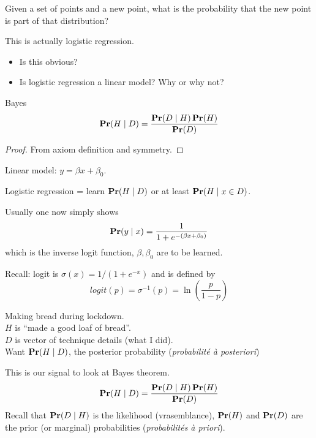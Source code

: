 \begin{example}
  Given a set of points and a new point, what is the probability that
  the new point is part of that distribution?
\end{example}

\begin{soln}
  This is actually logistic regression.

  \begin{itemize}
  \item Is this obvious?
  \item Is logistic regression a linear model?  Why or why not?
  \end{itemize}

  \begin{theorem}{Bayes}
    \begin{displaymath}
      \mathbf{Pr}(H\mid D) = \frac{\mathbf{Pr}(D\mid H)\, \mathbf{Pr}(H)}{\mathbf{Pr}(D)}
    \end{displaymath}
  \end{theorem}
  \begin{proof}
    From axiom definition and symmetry.
  \end{proof}

  Linear model: $y = \beta x + \beta_0$.

  Logistic regression = learn $\mathbf{Pr}(H\mid D)$ or at least $\mathbf{Pr}(H\mid
  x\in D)$.

  Usually one now simply shows
  \begin{displaymath}
    \mathbf{Pr}(y\mid x) = \frac{1}{1 + e^{-(\beta x + \beta_0)}}
  \end{displaymath}
  which is the inverse logit function, $\beta, \beta_0$ are to be
  learned.

  Recall: logit is $\sigma(x) = 1/(1+e^{-x})$ and is
  defined by
  \begin{displaymath}
    logit(p) = \sigma^{-1}(p) = \ln \left( \frac{p}{1-p} \right)
  \end{displaymath}

  \begin{example}
    Making bread during lockdown.\\
    $H$ is ``made a good loaf of bread''.\\
    $D$ is vector of technique details (what I did).\\
    Want $\mathbf{Pr}(H\mid D)$, the posterior probability (\textit{probabilité à posteriori})

    This is our signal to look at Bayes theorem.
    \begin{displaymath}
      \mathbf{Pr}(H\mid D) = \frac{\mathbf{Pr}(D\mid H)\, \mathbf{Pr}(H)}{\mathbf{Pr}(D)}
    \end{displaymath}
    Recall that $\mathbf{Pr}(D\mid H)$ is the likelihood (vrasemblance),
    $\mathbf{Pr}(H)$ and $\mathbf{Pr}(D)$ are the prior (or marginal) probabilities
    (\textit{probabilités à priori}).


\end{example}
\end{soln}
